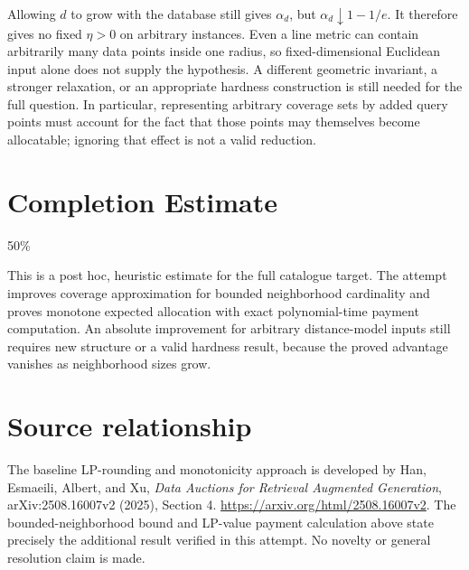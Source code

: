 \documentclass[11pt]{article}
\begin{document}
Allowing $d$ to grow with the database still gives $\alpha_d$, but
$\alpha_d\downarrow1-1/e$. It therefore gives no fixed $\eta>0$ on arbitrary
instances. Even a line metric can contain arbitrarily many data points
inside one radius, so fixed-dimensional Euclidean input alone does not
supply the hypothesis. A different geometric invariant, a stronger
relaxation, or an appropriate hardness construction is still needed for
the full question. In particular, representing arbitrary coverage sets
by added query points must account for the fact that those points may
themselves become allocatable; ignoring that effect is not a valid reduction.

\section{Completion Estimate}
50\%

This is a post hoc, heuristic estimate for the full catalogue target.
The attempt improves coverage approximation for bounded neighborhood cardinality and proves monotone expected allocation with exact polynomial-time payment computation. An absolute improvement for arbitrary distance-model inputs still requires new structure or a valid hardness result, because the proved advantage vanishes as neighborhood sizes grow.

\section*{Source relationship}
The baseline LP-rounding and monotonicity approach is developed by Han,
Esmaeili, Albert, and Xu, \emph{Data Auctions for Retrieval Augmented Generation}, arXiv:2508.16007v2 (2025), Section 4.
\url{https://arxiv.org/html/2508.16007v2}.
The bounded-neighborhood bound and LP-value payment calculation above
state precisely the additional result verified in this attempt. No novelty
or general resolution claim is made.
\end{document}

